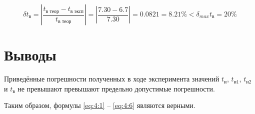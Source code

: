 \begin{displaymath}
	\delta t_{\text{в}} = \left| \frac{t_{\text{в теор}} - t_{\text{в эксп}}}{t_{\text{в теор}}} \right| = \left| \frac{7.30 - 6.7}{7.30} \right| = 0.0821 = 8.21 \% < \delta_{max} t_{\text{в}} = 20 \%
\end{displaymath}

\section{Выводы}

Приведённые погрешности полученных в ходе эксперимента значений $t_{\text{и}}$, $t_{\text{и1}}$, $t_{\text{и2}}$ и $t_{\text{в}}$ не превышают превышают предельно допустимые погрешности.

Таким образом, формулы \ref{eq:4:1} -- \ref{eq:4:6} являются верными.

